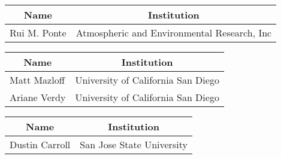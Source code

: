 \documentclass[letterpaper]{article}
\begin{document}
\vspace{.25cm}

\vspace{.25cm}
\begin{center}
\begin{tabular}{m{} m{} }
    \multicolumn{1}{c}{\textbf{Name}} & \multicolumn{1}{c}{\textbf{Institution}} \\ \hline
    Rui M. Ponte & Atmospheric and Environmental Research, Inc\\ \hline
\end{tabular}
\end{center}


\begin{center}
\begin{tabular}{m{} m{} }
    \multicolumn{1}{c}{\textbf{Name}} & \multicolumn{1}{c}{\textbf{Institution}} \\ \hline
    Matt Mazloff  & University of California San Diego \\ \hline
    Ariane Verdy  & University of California San Diego \\ \hline
\end{tabular}
\end{center}

\vspace{.25cm}

\begin{center}
\begin{tabular}{m{} m{} }
    \multicolumn{1}{c}{\textbf{Name}} & \multicolumn{1}{c}{\textbf{Institution}} \\ \hline
    Dustin Carroll  & San Jose State University \\ \hline 
\end{tabular}
\end{center}

\vspace{.25cm}



\end{document}
